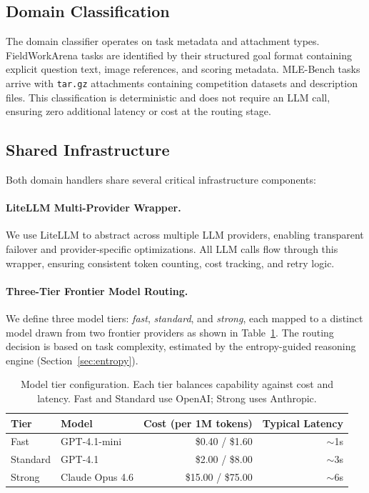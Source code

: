 \documentclass[11pt]{article}
\begin{document}
\subsection{Domain Classification}

The domain classifier operates on task metadata and attachment types. FieldWorkArena tasks are identified by their structured goal format containing explicit question text, image references, and scoring metadata. MLE-Bench tasks arrive with \texttt{tar.gz} attachments containing competition datasets and description files. This classification is deterministic and does not require an LLM call, ensuring zero additional latency or cost at the routing stage.

\subsection{Shared Infrastructure}

Both domain handlers share several critical infrastructure components:

\paragraph{LiteLLM Multi-Provider Wrapper.} We use LiteLLM \citep{litellm2024} to abstract across multiple LLM providers, enabling transparent failover and provider-specific optimizations. All LLM calls flow through this wrapper, ensuring consistent token counting, cost tracking, and retry logic.

\paragraph{Three-Tier Frontier Model Routing.} We define three model tiers: \emph{fast}, \emph{standard}, and \emph{strong}, each mapped to a distinct model drawn from two frontier providers as shown in Table~\ref{tab:model_tiers}. The routing decision is based on task complexity, estimated by the entropy-guided reasoning engine (Section~\ref{sec:entropy}).

\begin{table}[t]
\centering
\caption{Model tier configuration. Each tier balances capability against cost and latency. Fast and Standard use OpenAI; Strong uses Anthropic.}
\label{tab:model_tiers}
\begin{tabular}{@{}llrr@{}}
\toprule
\textbf{Tier} & \textbf{Model} & \textbf{Cost (per 1M tokens)} & \textbf{Typical Latency} \\
\midrule
Fast     & GPT-4.1-mini            & \$0.40 / \$1.60   & $\sim$1s \\
Standard & GPT-4.1                 & \$2.00 / \$8.00   & $\sim$3s \\
Strong   & Claude Opus 4.6         & \$15.00 / \$75.00  & $\sim$6s \\
\bottomrule
\end{tabular}
\end{table}
\end{document}
